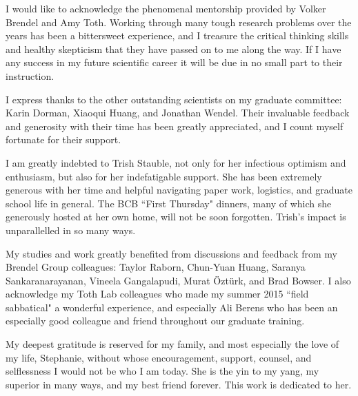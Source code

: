 
I would like to acknowledge the phenomenal mentorship provided by Volker Brendel and Amy Toth.
Working through many tough research problems over the years has been a bittersweet experience, and I treasure the critical thinking skills and healthy skepticism that they have passed on to me along the way.
If I have any success in my future scientific career it will be due in no small part to their instruction.

I express thanks to the other outstanding scientists on my graduate committee: Karin Dorman, Xiaoqui Huang, and Jonathan Wendel.
Their invaluable feedback and generosity with their time has been greatly appreciated, and I count myself fortunate for their support.

I am greatly indebted to Trish Stauble, not only for her infectious optimism and enthusiasm, but also for her indefatigable support.
She has been extremely generous with her time and helpful navigating paper work, logistics, and graduate school life in general.
The BCB ``First Thursday" dinners, many of which she generously hosted at her own home, will not be soon forgotten.
Trish's impact is unparallelled in so many ways.

My studies and work greatly benefited from discussions and feedback from my Brendel Group colleagues:
Taylor Raborn, Chun-Yuan Huang, Saranya Sankaranarayanan, Vineela Gangalapudi, Murat {\"O}zt{\"u}rk, and Brad Bowser.
I also acknowledge my Toth Lab colleagues who made my summer 2015 ``field sabbatical" a wonderful experience, and especially Ali Berens who has been an especially good colleague and friend throughout our graduate training.

My deepest gratitude is reserved for my family, and most especially the love of my life, Stephanie, without whose encouragement, support, counsel, and selflessness I would not be who I am today.
She is the yin to my yang, my superior in many ways, and my best friend forever.
This work is dedicated to her.
